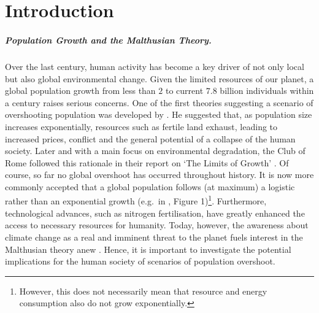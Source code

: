 
\chapter{Introduction}\label{chapter:Introduction}

\paragraph{Population Growth and the Malthusian Theory.}
Over the last century, human activity has become a key driver of not only local but also global environmental change. %
Given the limited resources of our planet, a global population growth from less than $2$ to current $7.8$ billion individuals within a century raises serious concerns.%
One of the first theories suggesting a scenario of overshooting population was developed by \citet{Malthus1798}. %
He suggested that, as population size increases exponentially, resources such as fertile land exhaust, leading to increased prices, conflict and the general potential of a collapse of the human society.
Later and with a main focus on environmental degradation, the Club of Rome followed this rationale in their report on `The Limits of Growth' \citep{clubofrome1972}.
Of course, so far no global overshoot has occurred throughout history. 
It is now more commonly accepted that a global population follows (at maximum) a logistic rather than an exponential growth (e.g.\ in , Figure 1)\footnote{However, this does not necessarily mean that resource and energy consumption also do not grow exponentially.}. 
Furthermore, technological advances, such as nitrogen fertilisation, have greatly enhanced the access to necessary resources for humanity.
Today, however, the awareness about climate change as a real and imminent threat to the planet fuels interest in the Malthusian theory anew \citep{Reuveny2012}.
Hence, it is important to investigate the potential implications for the human society of scenarios of population overshoot.




